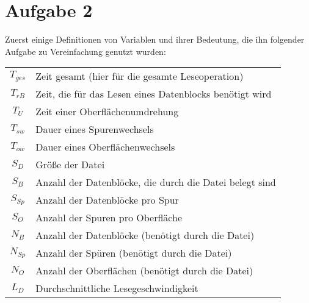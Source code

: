 \documentclass{ti2}
\begin{document}
\section*{Aufgabe 2}
Zuerst einige Definitionen von Variablen und ihrer Bedeutung, die ihn folgender Aufgabe zu Vereinfachung genutzt wurden:\\
\begin{tabular}{cl}
	$T_{ges}$	& Zeit gesamt (hier für die gesamte Leseoperation) \\
	$T_{rB}$	& Zeit, die für das Lesen eines Datenblocks benötigt wird \\
	$T_U$		& Zeit einer Oberflächenumdrehung \\
	$T_{sw}$	& Dauer eines Spurenwechsels \\
	$T_{ow}$	& Dauer eines Oberflächenwechsels \\
	$S_D$		& Größe der Datei \\
	$S_B$		& Anzahl der Datenblöcke, die durch die Datei belegt sind \\
	$S_{Sp}$	& Anzahl der Datenblöcke pro Spur \\
	$S_O$		& Anzahl der Spuren pro Oberfläche \\
	$N_B$		& Anzahl der Datenblöcke (benötigt durch die Datei) \\
	$N_{Sp}$	& Anzahl der Spüren (benötigt durch die Datei) \\
	$N_O$		& Anzahl der Oberflächen (benötigt durch die Datei) \\
	$L_D$		& Durchschnittliche Lesegeschwindigkeit \\
\end{tabular}
\end{document}
